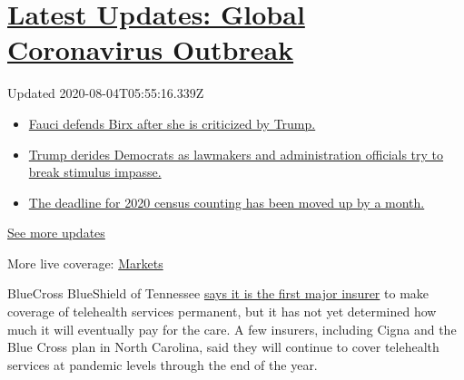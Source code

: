 \hypertarget{latest-updates-global-coronavirus-outbreak}{%
\section{\texorpdfstring{\href{https://www.nytimes.com/2020/08/03/world/coronavirus-covid-19.html?action=click\&pgtype=Article\&state=default\&region=MAIN_CONTENT_1\&context=storylines_live_updates}{Latest
Updates: Global Coronavirus
Outbreak}}{Latest Updates: Global Coronavirus Outbreak}}\label{latest-updates-global-coronavirus-outbreak}}

Updated 2020-08-04T05:55:16.339Z

\begin{itemize}
\tightlist
\item
  \href{https://www.nytimes.com/2020/08/03/world/coronavirus-covid-19.html?action=click\&pgtype=Article\&state=default\&region=MAIN_CONTENT_1\&context=storylines_live_updates\#link-4547638f}{Fauci
  defends Birx after she is criticized by Trump.}
\item
  \href{https://www.nytimes.com/2020/08/03/world/coronavirus-covid-19.html?action=click\&pgtype=Article\&state=default\&region=MAIN_CONTENT_1\&context=storylines_live_updates\#link-15e7f995}{Trump
  derides Democrats as lawmakers and administration officials try to
  break stimulus impasse.}
\item
  \href{https://www.nytimes.com/2020/08/03/world/coronavirus-covid-19.html?action=click\&pgtype=Article\&state=default\&region=MAIN_CONTENT_1\&context=storylines_live_updates\#link-e5a2cda}{The
  deadline for 2020 census counting has been moved up by a month.}
\end{itemize}

\href{https://www.nytimes.com/2020/08/03/world/coronavirus-covid-19.html?action=click\&pgtype=Article\&state=default\&region=MAIN_CONTENT_1\&context=storylines_live_updates}{See
more updates}

More live coverage:
\href{https://www.nytimes.com/live/2020/08/03/business/stock-market-today-coronavirus?action=click\&pgtype=Article\&state=default\&region=MAIN_CONTENT_1\&context=storylines_live_updates}{Markets}

BlueCross BlueShield of Tennessee
\href{https://bcbstnews.com/pressreleases/bluecross-making-in-network-telehealth-services-permanent/}{says
it is the first major insurer} to make coverage of telehealth services
permanent, but it has not yet determined how much it will eventually pay
for the care. A few insurers, including Cigna and the Blue Cross plan in
North Carolina, said they will continue to cover telehealth services at
pandemic levels through the end of the year.

